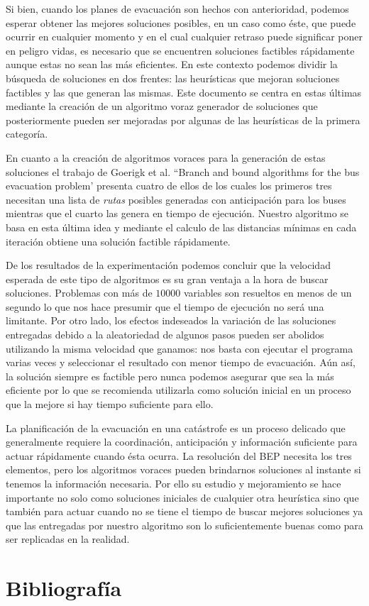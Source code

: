 \documentclass[letter, 10pt]{article}
\begin{document}
    Si bien, cuando los planes de evacuación son hechos con anterioridad, podemos
    esperar obtener las mejores soluciones posibles, en un caso como éste, que
    puede ocurrir en cualquier momento y en el cual cualquier retraso puede
    significar poner en peligro vidas, es necesario que se encuentren soluciones
    factibles rápidamente aunque estas no sean las más eficientes. En este
    contexto podemos dividir la búsqueda de soluciones en dos frentes: las
    heurísticas que mejoran soluciones factibles y las que generan las mismas.
    Este documento se centra en estas últimas mediante la creación de un
    algoritmo voraz generador de soluciones que posteriormente pueden ser
    mejoradas por algunas de las heurísticas de la primera categoría.

    En cuanto a la creación de algoritmos voraces para la generación de estas
    soluciones el trabajo de Goerigk et al. ``Branch and bound algorithms for 
    the bus evacuation problem'\cite{goerigk2013branch} presenta cuatro de ellos
    de los cuales los primeros tres necesitan una lista de \emph{rutas} posibles
    generadas con anticipación para los buses mientras que el cuarto las genera
    en tiempo de ejecución. 
    Nuestro algoritmo se basa en esta última idea y mediante el calculo de las
    distancias mínimas en cada iteración obtiene una solución factible
    rápidamente.

    De los resultados de la experimentación podemos concluir que la velocidad
    esperada de este tipo de algoritmos es su gran ventaja a la hora de buscar
    soluciones. Problemas con más de $10000$ variables son resueltos en menos de
    un segundo lo que nos hace presumir que el tiempo de ejecución no será una
    limitante. Por otro lado, los efectos indeseados la variación de las 
    soluciones entregadas debido a la aleatoriedad de algunos pasos pueden ser 
    abolidos utilizando la misma velocidad que ganamos: nos basta con ejecutar
    el programa varias veces y seleccionar el resultado con menor tiempo de
    evacuación. Aún así, la solución siempre es factible pero nunca podemos
    asegurar que sea la más eficiente por lo que se recomienda utilizarla como
    solución inicial en un proceso que la mejore si hay tiempo suficiente para
    ello.

    La planificación de la evacuación en una catástrofe es un proceso delicado
    que generalmente requiere la coordinación, anticipación y información
    suficiente para actuar rápidamente cuando ésta ocurra. La resolución
    del BEP necesita los tres elementos, pero los algoritmos voraces pueden
    brindarnos soluciones al instante si tenemos la información necesaria. Por
    ello su estudio y mejoramiento se hace importante no solo como soluciones
    iniciales de cualquier otra heurística sino que también para actuar cuando
    no se tiene el tiempo de buscar mejores soluciones ya que las entregadas por
    nuestro algoritmo son lo suficientemente buenas como para ser replicadas en
    la realidad.

\section{Bibliografía}\label{sec:bib}



\end{document}
